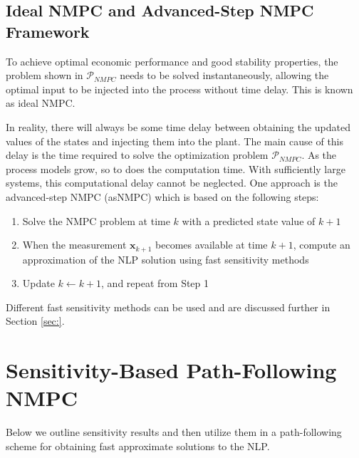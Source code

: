 \subsection{Ideal NMPC and Advanced-Step NMPC Framework}
To achieve optimal economic performance and good stability properties, the problem shown in $\mathcal{P}_{NMPC}$ needs to be solved instantaneously, allowing the optimal input to be injected into the process without time delay.
This is known as ideal NMPC.
\par
In reality, there will always be some time delay between obtaining the updated values of the states and injecting them into the plant.
The main cause of this delay is the time required to solve the optimization problem $\mathcal{P}_{NMPC}$.
As the process models grow, so to does the computation time.
With sufficiently large systems, this computational delay cannot be neglected.
One approach is the advanced-step NMPC (asNMPC) which is based on the following steps:
\begin{enumerate}
	\item Solve the NMPC problem at time $k$ with a predicted state value of $k+1$
	\item When the measurement $\boldsymbol{x}_{k+1}$ becomes available at time $k+1$, compute an approximation of the NLP solution using fast sensitivity methods
	\item Update $k\leftarrow k+1$, and repeat from Step 1
\end{enumerate}
Different fast sensitivity methods can be used and are discussed further in Section \ref{sec:}.
\section{Sensitivity-Based Path-Following NMPC}
Below we outline sensitivity results and then utilize them in a path-following scheme for obtaining fast approximate solutions to the NLP.

